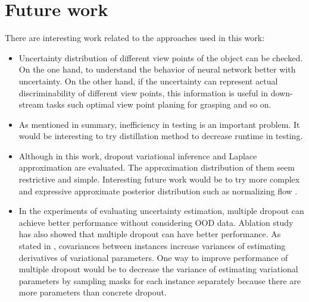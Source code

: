 \section{Future work}
There are interesting work related to the approaches used in this work:
\begin{itemize}
	\item Uncertainty distribution of different view points of the object can be checked. On the one hand, to understand the behavior of neural network better with uncertainty. On the other hand, if the uncertainty can represent actual discriminability of different view points, this information is useful in down-stream tasks such optimal view point planing for grasping and so on. 
	\item As mentioned in summary, inefficiency in testing is an important problem. It would be interesting to try distillation method to decrease runtime in testing.
	\item Although in this work, dropout variational inference and Laplace approximation are evaluated. The approximation distribution of them seem restrictive and simple. Interesting future work would be to try more complex and expressive approximate posterior distribution such as normalizing flow .
	\item In the experiments of evaluating uncertainty estimation, multiple dropout can achieve better performance without considering \gls{OOD} data. Ablation study has also showed that multiple dropout can have better performance. As stated in \cite{kingma2015variational}, covariances between instances increase variances of estimating derivatives of variational parameters. One way to improve performance of multiple dropout would be to decrease the variance of estimating variational parameters by sampling masks for each instance separately because there are more parameters than concrete dropout. 
\end{itemize}